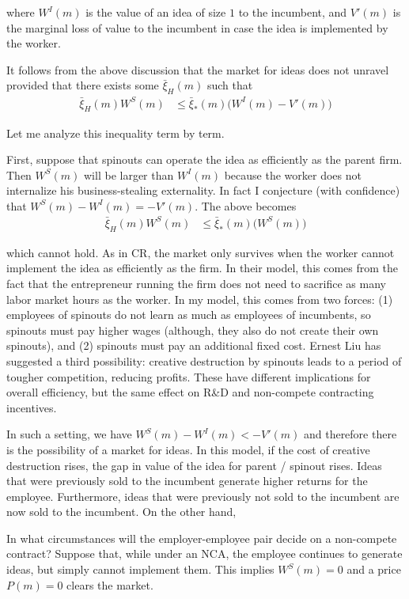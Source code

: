 \documentclass[12pt,english]{article}
\theoremstyle{remark}
\begin{document}
where $W^I(m)$ is the value of an idea of size $1$ to the incumbent, and $V'(m)$ is the marginal loss of value to the incumbent in case the idea is implemented by the worker.

It follows from the above discussion that the market for ideas does not unravel provided that there exists some $\bar{\xi}_H(m)$ such that 
\begin{align}
	\bar{\xi}_H(m) W^S(m) &\le \bar{\xi}_*(m) \Big( W^I(m) - V'(m) \Big)
\end{align}

Let me analyze this inequality term by term. 

First, suppose that spinouts can operate the idea as efficiently as the parent firm. Then $W^S(m)$ will be larger than $W^I(m)$ because the worker does not internalize his business-stealing externality. In fact I conjecture (with confidence) that $W^S(m) - W^I(m) = -V'(m)$. The above becomes 
\begin{align*}
	\bar{\xi}_H(m) W^S(m) &\le \bar{\xi}_*(m) \Big( W^S(m) \Big)
\end{align*}

which cannot hold. As in CR, the market only survives when the worker cannot implement the idea as efficiently as the firm. In their model, this comes from the fact that the entrepreneur running the firm does not need to sacrifice as many labor market hours as the worker. In my model, this comes from two forces: (1) employees of spinouts do not learn as much as employees of incumbents, so spinouts must pay higher wages (although, they also do not create their own spinouts), and (2) spinouts must pay an additional fixed cost. Ernest Liu has suggested a third possibility: creative destruction by spinouts leads to a period of tougher competition, reducing profits. These have different implications for overall efficiency, but the same effect on R\&D and non-compete contracting incentives. 

In such a setting, we have $W^S(m) - W^I(m) < -V'(m)$ and therefore there is the possibility of a market for ideas. In this model, if the cost of creative destruction rises, the gap in value of the idea for parent / spinout rises. Ideas that were previously sold to the incumbent generate higher returns for the employee. Furthermore, ideas that were previously not sold to the incumbent are now sold to the incumbent. On the other hand, 

In what circumstances will the employer-employee pair decide on a non-compete contract? Suppose that, while under an NCA, the employee continues to generate ideas, but simply cannot implement them. This implies $W^S(m) = 0$ and a price $P(m) = 0$ clears the market. 
\end{document}
